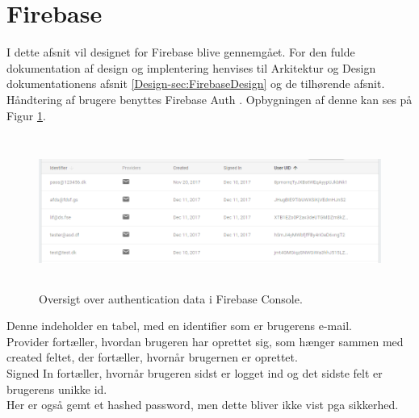 \section{Firebase}
I dette afsnit vil designet for Firebase blive gennemgået. For den fulde dokumentation af design og implentering henvises til Arkitektur og Design dokumentationens afsnit \ref{Design-sec:FirebaseDesign} og de tilhørende afsnit. \\

Håndtering af brugere benyttes Firebase Auth \cite{FirebaseAuth}. Opbygningen af denne kan ses på Figur \ref{fig:FirebaseAuthPNG}.

\begin{figure}[H] %
	\centering
	\includegraphics[height=5cm, width=15cm]{Design/Firebase/FirebaseAuth}
	\caption{Oversigt over authentication data i Firebase Console.}
	\label{fig:FirebaseAuthPNG}
\end{figure}
Denne indeholder en tabel, med en identifier som er brugerens e-mail. \\
Provider fortæller, hvordan brugeren har oprettet sig, som hænger sammen med created feltet, der fortæller, hvornår brugernen er oprettet. \\
Signed In fortæller, hvornår brugeren sidst er logget ind og det sidste felt er brugerens unikke id. \\
Her er også gemt et hashed password, men dette bliver ikke vist pga sikkerhed. \\

\clearpage

